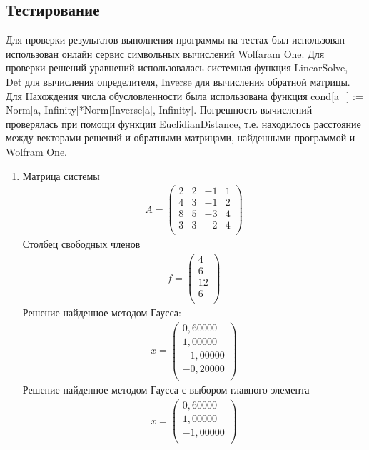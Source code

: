 \documentclass[a4paper,12pt,titlepage,finall]{article}
\begin{document}
\subsection{Тестирование}
Для проверки результатов выполнения программы на тестах был использован использован онлайн сервис символьных вычислений Wolfaram One. Для проверки решений уравнений использовалась системная функция {\ttfamily LinearSolve}, {\ttfamily Det} для вычисления определителя, {\ttfamily Inverse} для вычисления обратной матрицы. Для Нахождения числа обусловленности была использована функция {\ttfamily  cond[a\_] := Norm[a, Infinity]*Norm[Inverse[a], Infinity]}. Погрешность вычислений проверялась при помощи функции {\ttfamily EuclidianDistance}, т.е. находилось расстояние между векторами решений и обратными матрицами, найденными программой и Wolfram One.
\begin{enumerate}
\item
Матрица системы
\begin{align*}
A = \begin{pmatrix}
2&  2&  -1&  1 \\
4&  3&  -1&  2 \\
8&  5&  -3&  4 \\
3&  3&  -2&  4 \\
\end{pmatrix}
\end{align*}
Столбец свободных членов
\begin{align*}
f = \begin{pmatrix}
4 \\
6 \\
12 \\
6 \\
\end{pmatrix}
\end{align*}
Решение найденное методом Гаусса:
\begin{align*}
x = \begin{pmatrix}
0,60000 \\
   1,00000 \\
  -1,00000 \\
  -0,20000 \\
\end{pmatrix}
\end{align*}
Решение найденное методом Гаусса с выбором главного элемента
\begin{align*}
x = \begin{pmatrix}
0,60000 \\
   1,00000 \\
  -1,00000 \\

\end{pmatrix}
\end{align*}
\end{enumerate}
\end{document}
